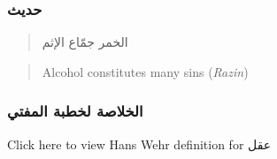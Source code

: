 \documentclass[
]{book}
\begin{document}
\hypertarget{ux62dux62fux64aux62b-6}{%
\subsubsection{حديث}\label{ux62dux62fux64aux62b-6}}

\begin{quote}
الخمر جمّاع الإثم
\end{quote}

\begin{quote}
Alcohol constitutes many sins (\emph{Razin})
\end{quote}

\hypertarget{ux627ux644ux62eux644ux627ux635ux629-ux644ux62eux637ux628ux629-ux627ux644ux645ux641ux62aux64a-6}{%
\subsubsection{الخلاصة لخطبة المفتي}\label{ux627ux644ux62eux644ux627ux635ux629-ux644ux62eux637ux628ux629-ux627ux644ux645ux641ux62aux64a-6}}

Click here to view Hans Wehr definition for عقل
\end{document}

